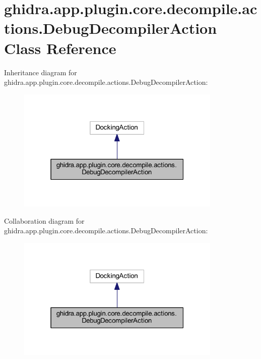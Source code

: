 \hypertarget{classghidra_1_1app_1_1plugin_1_1core_1_1decompile_1_1actions_1_1_debug_decompiler_action}{}\section{ghidra.\+app.\+plugin.\+core.\+decompile.\+actions.\+Debug\+Decompiler\+Action Class Reference}
\label{classghidra_1_1app_1_1plugin_1_1core_1_1decompile_1_1actions_1_1_debug_decompiler_action}


Inheritance diagram for ghidra.\+app.\+plugin.\+core.\+decompile.\+actions.\+Debug\+Decompiler\+Action\+:
\nopagebreak
\begin{figure}[H]
\begin{center}
\leavevmode
\includegraphics[width=277pt]{classghidra_1_1app_1_1plugin_1_1core_1_1decompile_1_1actions_1_1_debug_decompiler_action__inherit__graph}
\end{center}
\end{figure}


Collaboration diagram for ghidra.\+app.\+plugin.\+core.\+decompile.\+actions.\+Debug\+Decompiler\+Action\+:
\nopagebreak
\begin{figure}[H]
\begin{center}
\leavevmode
\includegraphics[width=277pt]{classghidra_1_1app_1_1plugin_1_1core_1_1decompile_1_1actions_1_1_debug_decompiler_action__coll__graph}
\end{center}
\end{figure}
